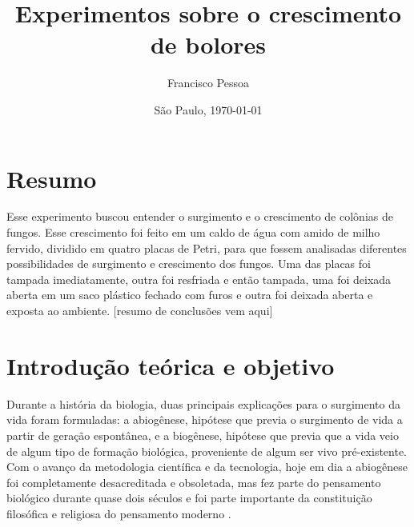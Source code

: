 \documentclass[12pt, titlepage]{article}
\author{Francisco Pessoa}
\affil{Colégio Ítaca}
\date{São Paulo, \today}
\title{Experimentos sobre o crescimento de bolores}
\begin{document}
\maketitle

\section*{Resumo}
Esse experimento buscou entender o surgimento e o crescimento de colônias de fungos. Esse crescimento foi feito em um caldo de água com amido de milho fervido, dividido em quatro placas de Petri, para que fossem analisadas diferentes possibilidades de surgimento e crescimento dos fungos. Uma das placas foi tampada imediatamente, outra foi resfriada e então tampada, uma foi deixada aberta em um saco plástico fechado com furos e outra foi deixada aberta e exposta ao ambiente. [resumo de conclusões vem aqui]

\section{Introdução teórica e objetivo}
Durante a história da biologia, duas principais explicações para o surgimento da vida foram formuladas: a abiogênese, hipótese que previa o surgimento de vida a partir de geração espontânea, e a biogênese, hipótese que previa que a vida veio de algum tipo de formação biológica, proveniente de algum ser vivo pré-existente. Com o avanço da metodologia científica e da tecnologia, hoje em dia a abiogênese foi completamente desacreditada e obsoletada, mas fez parte do pensamento biológico durante quase dois séculos e foi parte importante da constituição filosófica e religiosa do pensamento moderno \cite{levine-evers}.

\printbibliography
\end{document}
